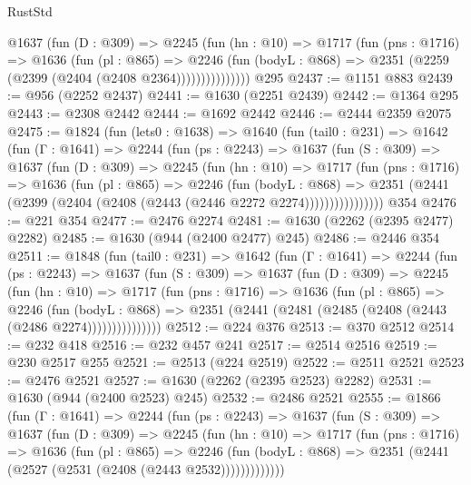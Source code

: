 \begin{lexlean}{RustStd}
\begin{coremodule}
              @1637
                (fun (D : @309) =>
                @2245
                  (fun (hn : @10) =>
                  @1717
                    (fun (pns : @1716) =>
                    @1636
                      (fun (pl : @865) =>
                      @2246
                        (fun (bodyL : @868) =>
                        @2351 (@2259 (@2399 (@2404 (@2408 @2364)))))))))))))))
    @295
@2437 := @1151 @883
@2439 := @956 (@2252 @2437)
@2441 := @1630 (@2251 @2439)
@2442 := @1364 @295
@2443 := @2308 @2442
@2444 := @1692 @2442
@2446 := @2444 @2359 @2075
@2475 := @1824
    (fun (lets0 : @1638) =>
    @1640
      (fun (tail0 : @231) =>
      @1642
        (fun (Γ : @1641) =>
        @2244
          (fun (ps : @2243) =>
          @1637
            (fun (S : @309) =>
            @1637
              (fun (D : @309) =>
              @2245
                (fun (hn : @10) =>
                @1717
                  (fun (pns : @1716) =>
                  @1636
                    (fun (pl : @865) =>
                    @2246
                      (fun (bodyL : @868) =>
                      @2351 (@2441 (@2399 (@2404 (@2408 (@2443 (@2446 @2272 @2274))))))))))))))))
    @354
@2476 := @221 @354
@2477 := @2476 @2274
@2481 := @1630 (@2262 (@2395 @2477) @2282)
@2485 := @1630 (@944 (@2400 @2477) @245)
@2486 := @2446 @354
@2511 := @1848
    (fun (tail0 : @231) =>
    @1642
      (fun (Γ : @1641) =>
      @2244
        (fun (ps : @2243) =>
        @1637
          (fun (S : @309) =>
          @1637
            (fun (D : @309) =>
            @2245
              (fun (hn : @10) =>
              @1717
                (fun (pns : @1716) =>
                @1636
                  (fun (pl : @865) =>
                  @2246
                    (fun (bodyL : @868) =>
                    @2351 (@2441 (@2481 (@2485 (@2408 (@2443 (@2486 @2274)))))))))))))))
@2512 := @224 @376
@2513 := @370 @2512
@2514 := @232 @418
@2516 := @232 @457 @241
@2517 := @2514 @2516
@2519 := @230 @2517 @255
@2521 := @2513 (@224 @2519)
@2522 := @2511 @2521
@2523 := @2476 @2521
@2527 := @1630 (@2262 (@2395 @2523) @2282)
@2531 := @1630 (@944 (@2400 @2523) @245)
@2532 := @2486 @2521
@2555 := @1866
    (fun (Γ : @1641) =>
    @2244
      (fun (ps : @2243) =>
      @1637
        (fun (S : @309) =>
        @1637
          (fun (D : @309) =>
          @2245
            (fun (hn : @10) =>
            @1717
              (fun (pns : @1716) =>
              @1636
                (fun (pl : @865) =>
                @2246
                  (fun (bodyL : @868) => @2351 (@2441 (@2527 (@2531 (@2408 (@2443 @2532)))))))))))))

\end{coremodule}
\end{lexlean}
